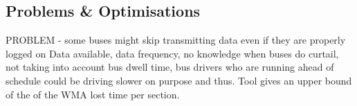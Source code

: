 \subsection{Problems \& Optimisations}
PROBLEM - some buses might skip transmitting data even if they are properly logged on
Data available, data frequency, no knowledge when buses do curtail, not taking into account bus dwell time, bus drivers who are running ahead of schedule could be driving slower on purpose and thus. Tool gives an upper bound of the of the WMA lost time per section. 
